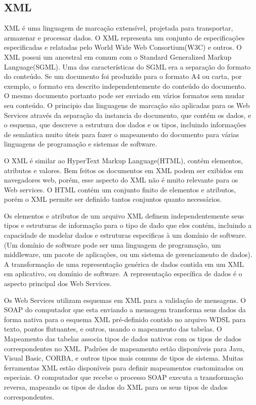 \documentclass{acm_proc_article-sp}
\begin{document}
	\subsection{XML}
		XML é uma linguagem de marcação extensível, projetada para transportar, armazenar e processar dados. O XML representa um conjunto de especificações especificadas e relatadas pelo World Wide Web Consortium(W3C) e outros. O XML possui um ancestral em comum com o Standard Generalized Markup Language(SGML). Uma das características do SGML era a separação do formato do conteúdo. Se um documento foi produzido para o formato A4 ou carta, por exemplo, o formato era descrito independentemente do conteúdo do documento. O mesmo documento portanto pode ser enviado em vários formatos sem mudar seu conteúdo. O principio das linguagens de marcação são aplicadas para os Web Services através da separação da instancia do documento, que contém os dados, e o esquema, que descreve a estrutura dos dados e os tipos, incluindo informações de semântica muito úteis para fazer o mapeamento do documento para várias linguagens de programação e sistemas de software.
		
		O XML é similar ao HyperText Markup Language(HTML), contém elementos, atributos e valores. Bem feitos os documentos em XML podem ser exibidos em navegadores web, porém, esse aspecto do XML não é muito relevante para os Web services. O HTML contém um conjunto finito de elementos e atributos, porém o XML permite ser definido tantos conjuntos quanto necessários.
		
		Os elementos e atributos de um arquivo XML definem independentemente seus tipos e estruturas de informação para o tipo de dado que eles contém, incluindo a capacidade de modelar dados e estruturas especificas à um domínio de software. (Um domínio de software pode ser uma linguagem de programação, um middleware, um pacote de aplicações, ou um sistema de gerenciamento de dados). A transformação de uma representação genérica de dados contida em um XML em aplicativo, ou domínio de software. A representação específica de dados é o aspecto principal dos Web Services.
		
		Os Web Services utilizam esquemas em XML para a validação de mensagens. O SOAP do computador que esta enviando a mensagem transforma seus dados da forma nativa para o esquema XML pré-definido contido no arquivo WDSL para texto, pontos flutuantes, e outros, usando o mapeamento das tabelas. O Mapeamento das tabelas associa tipos de dados nativos com os tipos de dados correspondentes no XML. Padrões de mapeamento estão disponíveis para Java, Visual Basic, CORBA, e outros tipos mais comuns de tipos de sistema. Muitas ferramentas XML estão disponíveis para definir mapeamentos customizados ou especiais. O computador que recebe o processo SOAP executa a transformação reversa, mapeando os tipos de dados do XML para os seus tipos de dados correspondentes.
		
\end{document}
